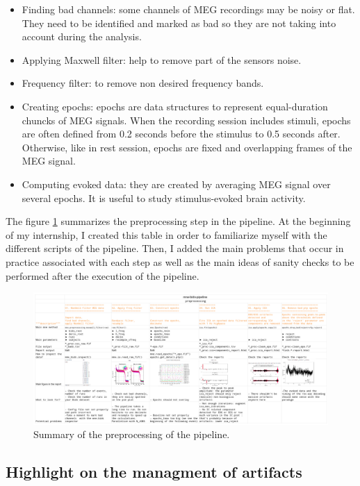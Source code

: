 \begin{itemize}
    \item Finding bad channels: some channels of MEG recordings may be noisy or flat. They need to be identified and marked as bad so they are not taking into account during the analysis.
    \item Applying Maxwell filter: help to remove part of the sensors noise.
    \item Frequency filter: to remove non desired frequency bands.
    \item Creating epochs: epochs are data structures to represent equal-duration chuncks of MEG signals. When the recording session includes stimuli, epochs are often defined from 0.2 seconds before the stimulus to 0.5 seconds after. Otherwise, like in rest session, epochs are fixed and overlapping frames of the MEG signal.
    \item Computing evoked data: they are created by averaging MEG signal over several epochs. It is useful to study stimulus-evoked brain activity.
\end{itemize}


The figure \ref{cheat_sheet} summarizes the preprocessing step in the pipeline. At the beginning of my internship, I created this table in order to familiarize myself with the different scripts of the pipeline. Then, I added the main problems that occur in practice associated with each step as well as the main ideas of sanity checks to be performed after the execution of the pipeline.

\begin{figure}[ht]
    \centering
    \includegraphics[width=15cm]{images_report/preprocessing/cheatsheet preprocessing.png}
    \caption[Summary of the preprocessing of the pipeline.]%
    {Summary of the preprocessing of the pipeline.}
    \label{cheat_sheet}
\end{figure}

\subsection{Highlight on the managment of artifacts}
\label{preprocessing_of_artifacts}


